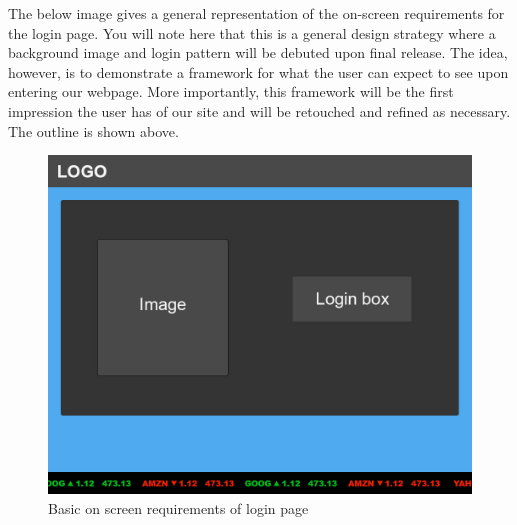 \newpage
The below image gives a general representation of the on-screen requirements for the login page. You will note here that this is a general design strategy where a background image and login pattern will be debuted upon final release. The idea, however, is to demonstrate a framework for what the user can expect to see upon entering our webpage. More importantly, this framework will be the first impression the user has of our site and will be retouched and refined as necessary. The outline is shown above.\\

\begin{figure}[H]
\centering
\includegraphics[width=5.5in]{./img/mock/loginmock.jpg}
\caption{Basic on screen requirements of login page}
\label{ui:mockup}
\end{figure}
